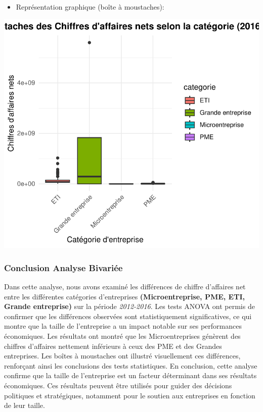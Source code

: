 \documentclass[mstat,12pt]{unswthesis}
\begin{document}
\medskip

\begin{itemize}
\tightlist
\item
  Représentation graphique (boîte à moustaches):
\end{itemize}

\includegraphics{TDDT_projet_L_2_files/figure-latex/unnamed-chunk-29-1.pdf}

\newpage

\subsubsection{Conclusion Analyse
Bivariée}\label{conclusion-analyse-bivariuxe9e}

\medskip

Dans cette analyse, nous avons examiné les différences de chiffre
d'affaires net entre les différentes catégories d'entreprises
\textbf{(Microentreprise, PME, ETI, Grande entreprise)} sur la période
\emph{2012-2016}. Les tests ANOVA ont permis de confirmer que les
différences observées sont statistiquement significatives, ce qui montre
que la taille de l'entreprise a un impact notable sur ses performances
économiques. \medskip Les résultats ont montré que les Microentreprises
génèrent des chiffres d'affaires nettement inférieurs à ceux des PME et
des Grandes entreprises. Les boîtes à moustaches ont illustré
visuellement ces différences, renforçant ainsi les conclusions des tests
statistiques. \medskip En conclusion, cette analyse confirme que la
taille de l'entreprise est un facteur déterminant dans ses résultats
économiques. Ces résultats peuvent être utilisés pour guider des
décisions politiques et stratégiques, notamment pour le soutien aux
entreprises en fonction de leur taille.
\end{document}
